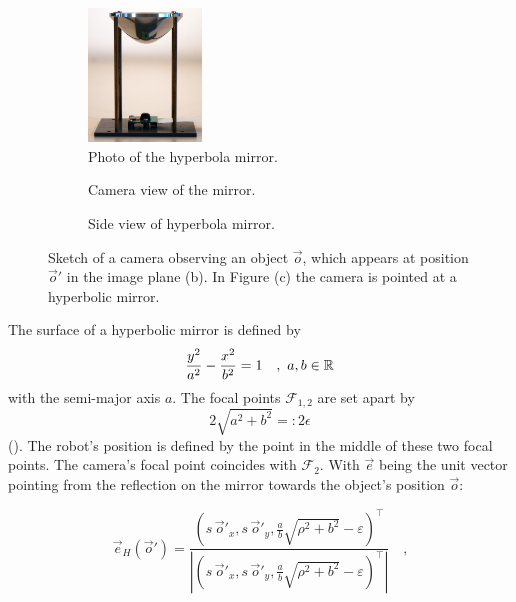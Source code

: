 \begin{figure}
  \centering
  \begin{subfigure}[]{0.3\textwidth}
    \centering
    \includegraphics[height=3.55cm]{./figures/robot/photos/mirror.jpg}
    \caption{Photo of the hyperbola mirror.}
    \label{fig:robot_method_algorithms_mirror_hyperbolaphoto}
  \end{subfigure}\hfill
  \begin{subfigure}[]{0.3\textwidth}
    \centering
    
    \caption{Camera view of the mirror.}
    \label{fig:robot_method_algorithms_mirror_sphere_front}
  \end{subfigure}\hfill
  \begin{subfigure}[]{0.3\textwidth}
    \centering
    
    \caption{Side view of hyperbola mirror.}
    \label{fig:robot_method_algorithms_mirror_hyperbola_top}
  \end{subfigure}
  \caption{Sketch of a camera observing an object $\vec{o}$, which appears at position $\vec o'$ in the image plane (b). In Figure (c) the camera is pointed at a hyperbolic mirror.}
  \label{fig:robot_method_algorithms_mirror}
\end{figure}

\newcommand{\Fi}{\ensuremath{\mathcal{F}_1}}
\newcommand{\Fii}{\ensuremath{\mathcal{F}_2}}

The surface of a hyperbolic mirror is defined by
\begin{equation}
  \frac{y^2}{a^2} - \frac{x^2}{b^2} = 1 \quad,~a, b \R{1}
\end{equation}
with the semi-major axis $a$. 
The focal points $\mathcal{F}_{1,2}$ are set apart by \[{2\sqrt{a^2 + b^2} =: 2\epsilon}\] ().
The robot's position is defined by the point in the middle of these two focal points.
The camera's focal point coincides with $\Fii$.
With ${\vec e}$ being the unit vector pointing from the reflection on the mirror towards the object's position $\vec o$:

\begin{equation}
  \nonumber
  \vec e_H(\vec o') =
    \frac{\left( s \, \vec o'_x, s \, \vec o'_y, \frac{a}{b} \sqrt{\rho^2 + b^2} - \varepsilon \right)^\intercal}
    {\left| \left( s \, \vec o'_x, s \, \vec o'_y, \frac{a}{b} \sqrt{\rho^2 + b^2} - \varepsilon \right)^\intercal \right|} \quad \text{,}
\end{equation}

